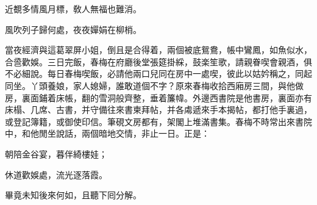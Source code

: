 \begin{myquote}
近覩多情風月標，敎人無福也難消。

風吹列子歸何處，夜夜嬋娟在柳梢。
\end{myquote}

當夜經濟與這葛翠屏小姐，倒且是合得着，兩個被底鴛鴦，帳中鸞鳳，如魚似水，合巹歡娛。三日完飯，春梅在府廳後堂張筵掛綵，鼓楽笙歌，請親眷喫會親酒，俱不必細說。每日春梅喫飯，必請他兩口兒同在房中一處喫，彼此以姑妗稱之，同起同坐。丫頭養娘，家人媳婦，誰敢道個不字？原來春梅收拾西廂房三間，與他做房，裏面鋪着床帳，翻的雪洞般齊整，垂着簾幃。外邊西書院是他書房，裏面亦有床榻、几席、古書，并守備往來書柬拜帖，并各䖏遞來手本揭帖，都打他手裏過，或登記簿籍，或御使印信。筆硯文房都有，架閣上堆滿書集。春梅不時常出來書院中，和他閒坐說話，兩個暗地交情，非止一日。正是：

\begin{myquote}
朝陪金谷宴，暮伴綺樓娃；

休道歡娛處，流光逐落霞。
\end{myquote}

畢竟未知後來何如，且聽下囘分解。

